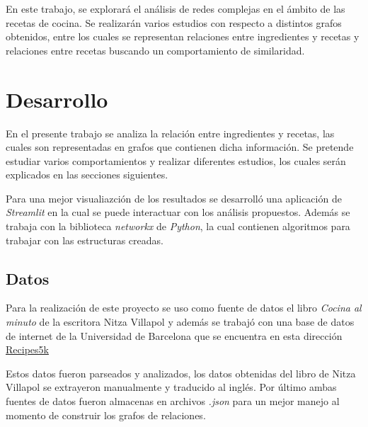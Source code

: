 \documentclass[a4paper]{article}
\begin{document}
En este trabajo, se explorará el análisis de redes complejas en el ámbito de las
recetas de cocina. Se realizarán varios estudios con respecto a distintos grafos
obtenidos, entre los cuales se representan relaciones entre ingredientes y
recetas y relaciones entre recetas buscando un comportamiento de similaridad.




\section{Desarrollo}\label{sec:dev}
En el presente trabajo se analiza la relación entre ingredientes y recetas,
las cuales son representadas en grafos que contienen dicha información. Se
pretende estudiar varios comportamientos y realizar diferentes estudios, los
cuales serán explicados en las secciones siguientes. 

Para una mejor visualiazción de los resultados se desarrolló una aplicación de
\emph{Streamlit} en la cual se puede interactuar con los análisis propuestos.
Además se trabaja con la biblioteca \emph{networkx} de \emph{Python}, la cual
contienen algoritmos para trabajar con las estructuras creadas.

\subsection{Datos}\label{sub:data}

Para la realización de este proyecto se uso como fuente de datos el libro
\emph{Cocina al minuto} de la escritora Nitza Villapol y además se trabajó con
una base de datos de internet de la Universidad de Barcelona que se encuentra
en esta dirección \href{http://www.ub.edu/cvub/recipes5k/}{Recipes5k}

Estos datos fueron parseados y analizados, los datos obtenidas del libro de
Nitza Villapol se extrayeron manualmente y traducido al inglés. Por último ambas
fuentes de datos fueron almacenas en archivos \emph{.json} para un mejor manejo
al momento de construir los grafos de relaciones.
\end{document}

